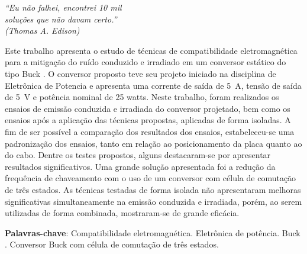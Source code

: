 \documentclass[
	12pt,				%
	openright,			%
	oneside,			%
	a4paper,			%
	chapter=TITLE,		%
	english,			%
	french,				%
	spanish,			%
	brazil				%
	]{abntex2}
\begin{document}
\begin{epigrafe}
    \vspace*{\fill}
	\begin{flushright}
		\textit{``Eu não falhei, encontrei 10 mil\\
		soluções que não davam certo.'' \\
		(Thomas A. Edison)}
	\end{flushright}
\end{epigrafe}

\setlength{\absparsep}{18pt} %
\begin{resumo}
    Este trabalho apresenta o estudo de técnicas de compatibilidade eletromagnética para a mitigação do ruído conduzido e irradiado em um conversor estático do tipo Buck \Interleaved. O conversor proposto teve seu projeto iniciado na disciplina de Eletrônica de Potencia e apresenta uma  corrente de saída de \SI{5}{\ampere}, tensão de saída de \SI{5}{\volt} e potência nominal de 25 watts. Neste trabalho, foram realizados os ensaios de emissão conduzida e irradiada do conversor projetado, bem como os ensaios após a aplicação das técnicas propostas, aplicadas de forma isoladas. A fim de ser possível a comparação dos resultados dos ensaios, estabeleceu-se uma padronização dos ensaios, tanto em relação ao posicionamento da placa quanto ao do cabo. Dentre os testes propostos, alguns destacaram-se por apresentar resultados significativos. Uma grande solução apresentada foi a redução da frequência de chaveamento com o uso de um conversor com célula de comutação de três estados. As técnicas testadas de forma isolada não apresentaram melhoras significativas simultaneamente na emissão conduzida e irradiada, porém, ao serem utilizadas de forma combinada, mostraram-se de grande eficácia.
    
    \textbf{Palavras-chave}: Compatibilidade eletromagnética. Eletrônica de potência. Buck \interleaved. Conversor Buck com célula de comutação de três estados.
\end{resumo}
\end{document}
